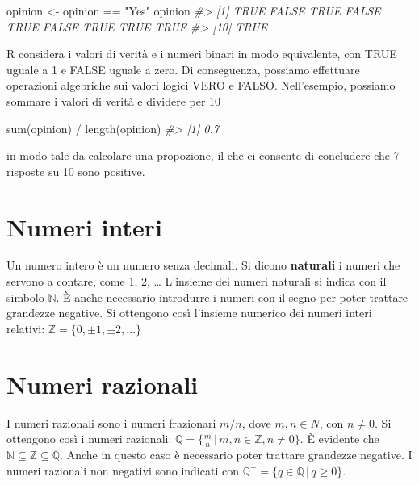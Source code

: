 \documentclass[
]{memoir}
\newenvironment{Shaded}{\begin{snugshade}}{\end{snugshade}}
\newcommand{\CommentTok}[1]{\textcolor[rgb]{0.56,0.35,0.01}{\textit{#1}}}
\newcommand{\FunctionTok}[1]{\textcolor[rgb]{0.00,0.00,0.00}{#1}}
\newcommand{\NormalTok}[1]{#1}
\newcommand{\OtherTok}[1]{\textcolor[rgb]{0.56,0.35,0.01}{#1}}
\newcommand{\SpecialCharTok}[1]{\textcolor[rgb]{0.00,0.00,0.00}{#1}}
\newcommand{\StringTok}[1]{\textcolor[rgb]{0.31,0.60,0.02}{#1}}
\theoremstyle{definition}
\theoremstyle{definition}
\theoremstyle{definition}
\theoremstyle{definition}
\theoremstyle{remark}
\begin{document}
\begin{Shaded}
\begin{Highlighting}[]
\NormalTok{opinion }\OtherTok{\textless{}{-}}\NormalTok{ opinion }\SpecialCharTok{==} \StringTok{"Yes"}
\NormalTok{opinion}
\CommentTok{\#\textgreater{}  [1]  TRUE FALSE  TRUE FALSE  TRUE FALSE  TRUE  TRUE  TRUE}
\CommentTok{\#\textgreater{} [10]  TRUE}
\end{Highlighting}
\end{Shaded}

R considera i valori di verità e i numeri binari in modo equivalente, con
TRUE uguale a 1 e FALSE uguale a zero. Di conseguenza, possiamo
effettuare operazioni algebriche sui valori logici VERO e FALSO.
Nell'esempio, possiamo sommare i valori di verità e dividere per 10

\begin{Shaded}
\begin{Highlighting}[]
\FunctionTok{sum}\NormalTok{(opinion) }\SpecialCharTok{/} \FunctionTok{length}\NormalTok{(opinion)}
\CommentTok{\#\textgreater{} [1] 0.7}
\end{Highlighting}
\end{Shaded}

in modo tale da calcolare una propozione, il che ci consente di concludere che 7 risposte su 10 sono positive.

\hypertarget{numeri-interi}{%
\section{Numeri interi}\label{numeri-interi}}

Un numero intero è un numero senza decimali. Si dicono \textbf{naturali} i
numeri che servono a contare, come 1, 2, \ldots{} L'insieme dei numeri
naturali si indica con il simbolo \(\mathbb{N}\). È anche necessario
introdurre i numeri con il segno per poter trattare grandezze negative.
Si ottengono così l'insieme numerico dei numeri interi relativi:
\(\mathbb{Z} = \{0, \pm 1, \pm 2, \dots \}\)

\hypertarget{numeri-razionali}{%
\section{Numeri razionali}\label{numeri-razionali}}

I numeri razionali sono i numeri frazionari \(m/n\), dove \(m, n \in N\),
con \(n \neq 0\). Si ottengono così i numeri razionali:
\(\mathbb{Q} = \{\frac{m}{n} \,\vert\, m, n \in \mathbb{Z}, n \neq 0\}\).
È evidente che \(\mathbb{N} \subseteq \mathbb{Z} \subseteq \mathbb{Q}\).
Anche in questo caso è necessario poter trattare grandezze negative. I
numeri razionali non negativi sono indicati con
\(\mathbb{Q^+} = \{q \in \mathbb{Q} \,\vert\, q \geq 0\}\).
\end{document}
